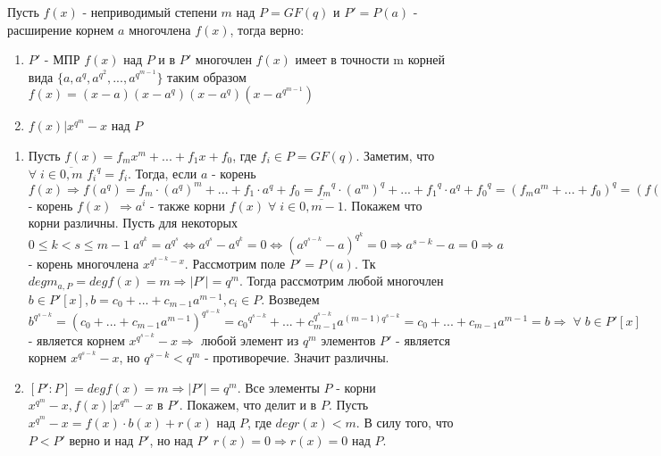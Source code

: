 \begin{proofs}
    Пусть $f(x)$ - неприводимый степени $m$ над $P = GF(q)$ и $P' = P(a)$ - расширение корнем $a$ многочлена $f(x)$, тогда верно:
    \begin{enumerate}
        \item $P'$ - МПР $f(x)$ над $P$ и в $P'$ многочлен $f(x)$ имеет в точности m корней вида $\{a, a^q, a^{q^2}, ..., a^{q^{m-1}}\}$
        таким образом $f(x) = (x - a)(x - a^{q})(x - a^{q})(x - a^{q^{m-1}})$
        \item $f(x) | x^{q^m} - x$ над $P$
    \end{enumerate}

  \begin{dokvo}
    \begin{enumerate}
        \item Пусть $f(x) = f_mx^m + ... + f_1x + f_0$, где $f_i \in P = GF(q)$. Заметим, что $\forall\; i \in \overline{0,m}$
        ${f_i}^q = f_i$. Тогда, если $a$ - корень $f(x) \Rightarrow f(a^q) = f_m\cdot(a^q)^m + ... + f_1\cdot a^q + f_0
        = {f_m}^q\cdot(a^m)^q + ... + {f_1}^q\cdot a^q + {f_0}^q = (f_m a^m + ... + f_0)^q = (f(a))^q = 0 \Rightarrow a$ - корень $f(x)$
        $\Rightarrow a^i$ - также корни $f(x)\; \forall\; i \in \overline{0,m-1}$. Покажем что корни различны.
        Пусть для некоторых $0 \leq k < s \leq m-1\; a^{q^k} = a^{q^s} \Leftrightarrow a^{q^s} - a^{q^k} = 0
        \Leftrightarrow (a^{q^{s-k}} - a)^{q^k} = 0 \Rightarrow a^{s-k} - a = 0 \Rightarrow a$ - корень многочлена
        $x^{q^{s-k} - x}$. Рассмотрим поле $P' = P(a)$. Тк $degm_{a,P} = degf(x) = m \Rightarrow |P'| = q^m$. Тогда рассмотрим любой многочлен
        $b \in P'[x], b = c_0 + ... + c_{m-1}a^{m-1}, c_i \in P$. Возведем $b^{q^{s-k}} = (c_0 + ... + c_{m-1}a^{m-1})^{q^{s-k}} = {c_0}^{q^{s-k}} + ... + c_{m-1}^{q^{s-k}} a^{(m-1)q^{s-k}} = c_0 + ... + c_{m-1}{a^{m-1}} = b \Rightarrow
        \; \forall\; b \in P'[x]$ - является корнем $x^{q^{s-k}} - x \Rightarrow$ любой элемент из $q^m$ элементов $P'$ - является корнем $x^{q^{s-k}} - x$,
        но $q^{s-k} < q^m$ - противоречие. Значит различны.
        \item $[P':P] = degf(x) = m \Rightarrow |P'| = q^m$. Все элементы $P$ - корни $x^{q^m} - x, f(x) | x^{q^m} - x$ в $P'$.
        Покажем, что делит и в $P$.  Пусть $x^{q^m} - x = f(x)\cdot b(x) + r(x)$ над $P$, где 
        $degr(x) < m$. В силу того, что $P < P'$ верно и над $P'$, но над $P'$ $r(x) = 0 \Rightarrow r(x) = 0$ над $P$.
    \end{enumerate}
    
	\end{dokvo}
\end{proofs}

